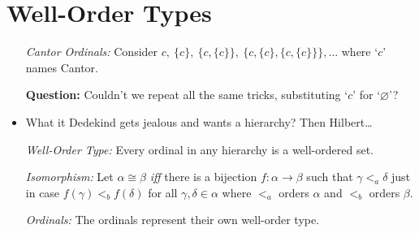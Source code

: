 \documentclass[a4paper, 11pt]{article} %
\newcommand{\set}[1]{\lbrace#1\rbrace} %
\begin{document}
\section*{Well-Order Types}

\begin{itemize}
  \item[\it Cantor Ordinals:] Consider $c,\ \set{c},\ \set{c,\set{c}},\ \set{c,\set{c},\set{c,\set{c}}},\ldots$ where `$c$' names Cantor.
  \item[\bf Question:] Couldn't we repeat all the same tricks, substituting `$c$' for `$\varnothing$'?
  \item What it Dedekind gets jealous and wants a hierarchy? Then Hilbert\ldots
  \item[\it Well-Order Type:] Every ordinal in any hierarchy is a well-ordered set.
  \item[\it Isomorphism:] Let $\alpha \cong \beta$ \textit{iff} there is a bijection $f: \alpha \to \beta$ such that $\gamma <_a \delta$ just in case $f(\gamma) <_b f(\delta)$ for all $\gamma,\delta\in\alpha$ where $<_a$ orders $\alpha$ and $<_b$ orders $\beta.$ 
  \item[\it Ordinals:] The ordinals represent their own well-order type. 
\end{itemize}
\end{document}
